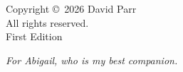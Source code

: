 
\newpage
\thispagestyle{empty}
\vspace*{\fill}
\begin{flushleft}
\small
Copyright \copyright\ 2026 David Parr \\
All rights reserved. \\[1em]
First Edition
\end{flushleft}
\newpage

\thispagestyle{empty}
\vspace*{\fill}
\begin{center}
\textit{For Abigail, who is my best companion.}
\end{center}
\vspace*{\fill}
\newpage

\tableofcontents
\newpage
